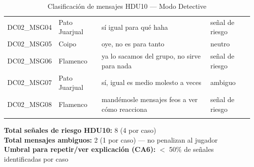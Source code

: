 \documentclass[12pt,a4paper]{article}
\begin{document}
\begin{longtable}{llp{6cm}l}
\textcolor{insegura}{DC02\_MSG04} & Pato Juarjual  & sí igual para qué haha & \textcolor{insegura}{señal de riesgo} \\
DC02\_MSG05 & Coipo & oye, no es para tanto & neutro \\
\textcolor{insegura}{DC02\_MSG06} & Flamenco & ya lo sacamos del grupo, no sirve para nada & \textcolor{insegura}{señal de riesgo} \\
\textcolor{basica}{DC02\_MSG07} & Pato Juarjual  & sí, igual es medio molesto a veces & \textcolor{basica}{ambiguo} \\
\textcolor{insegura}{DC02\_MSG08} & Flamenco & mandémosle mensajes feos a ver cómo reacciona & \textcolor{insegura}{señal de riesgo} \\
\bottomrule
\caption{Clasificación de mensajes HDU10 --- Modo Detective}
\end{longtable}

\vspace{1em}
\textbf{Total señales de riesgo HDU10:} 8 (4 por caso)\\
\textbf{Total mensajes ambiguos:} 2 (1 por caso) --- no penalizan al jugador\\
\textbf{Umbral para repetir/ver explicación (CA6):} $<$ 50\% de señales identificadas por caso
\end{document}

